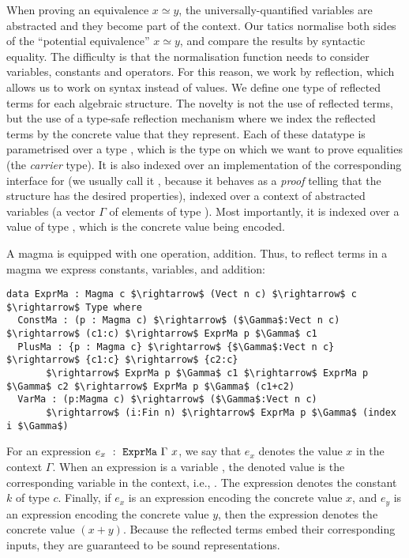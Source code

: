 When proving an equivalence $x \simeq y$, the universally-quantified
variables are abstracted and they become part of the context. Our
tatics normalise both sides of the ``potential equivalence'' $x
\simeq y$, and compare the results by syntactic equality. The
difficulty is that the normalisation function needs to consider
variables, constants and operators. For this
reason, we work by reflection, which allows us to work on syntax instead of values. We define one type of reflected
terms for each algebraic structure. The novelty is not the use of reflected
terms, but the use of a type-safe reflection
mechanism where we index the reflected terms by the concrete value that they
represent. Each of these datatype is parametrised over a type , which
is the type on which we want to prove equalities (the \emph{carrier}
type). It is also indexed over an implementation of the corresponding interface
for  (we usually call it , because it behaves as a \emph{proof}
telling that the structure  has the desired properties), indexed over a
context of abstracted variables (a vector $\Gamma$ of  elements of type
). Most importantly, it is indexed over a value of type ,
which is the concrete value being encoded.

A magma is equipped with one operation, addition. Thus, to reflect terms in a
magma we express constants, variables, and addition:

\begin{lstlisting}
data ExprMa : Magma c $\rightarrow$ (Vect n c) $\rightarrow$ c $\rightarrow$ Type where
  ConstMa : (p : Magma c) $\rightarrow$ ($\Gamma$:Vect n c) $\rightarrow$ (c1:c) $\rightarrow$ ExprMa p $\Gamma$ c1 
  PlusMa : {p : Magma c} $\rightarrow$ {$\Gamma$:Vect n c} $\rightarrow$ {c1:c} $\rightarrow$ {c2:c} 
       $\rightarrow$ ExprMa p $\Gamma$ c1 $\rightarrow$ ExprMa p $\Gamma$ c2 $\rightarrow$ ExprMa p $\Gamma$ (c1+c2) 
  VarMa : (p:Magma c) $\rightarrow$ ($\Gamma$:Vect n c)
       $\rightarrow$ (i:Fin n) $\rightarrow$ ExprMa p $\Gamma$ (index i $\Gamma$)
\end{lstlisting}


For an expression $e_x\ :\ \code{ExprMa}\ \Gamma\ x$, we say that $e_x$
denotes the value $x$ in the context $\Gamma$.  When an expression
is a variable , the denoted value is the
corresponding variable in the context, i.e., .  The
expression  denotes the constant $k$ of type
$c$. Finally, if $e_x$ is an expression encoding the concrete value $x$, and
$e_y$ is an expression encoding the concrete value $y$, then the expression
 denotes the concrete value $(x + y)$. Because the
reflected terms embed their corresponding inputs, they are guaranteed to be
sound representations.

